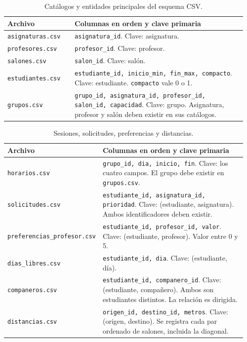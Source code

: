 \documentclass[11pt]{article}
\numberwithin{equation}{section}
\numberwithin{figure}{section}
\numberwithin{table}{section}
\theoremstyle{definition}
\begin{document}
\begin{table}[H]
\centering
\caption{Catálogos y entidades principales del esquema CSV.}
\small
\begin{tabular}{@{}p{0.27\linewidth}p{0.69\linewidth}@{}}
\toprule
\textbf{Archivo} & \textbf{Columnas en orden y clave primaria} \\
\midrule
\texttt{asignaturas.csv} &
\texttt{asignatura\_id}. Clave: asignatura. \\
\texttt{profesores.csv} &
\texttt{profesor\_id}. Clave: profesor. \\
\texttt{salones.csv} &
\texttt{salon\_id}. Clave: salón. \\
\texttt{estudiantes.csv} &
\texttt{estudiante\_id, inicio\_min, fin\_max, compacto}.\newline
Clave: estudiante. \texttt{compacto} vale 0 o 1. \\
\texttt{grupos.csv} &
\texttt{grupo\_id, asignatura\_id, profesor\_id,}\newline
\texttt{salon\_id, capacidad}. Clave: grupo. Asignatura,
profesor y salón deben existir en sus catálogos. \\
\bottomrule
\end{tabular}
\end{table}

\begin{table}[H]
\centering
\caption{Sesiones, solicitudes, preferencias y distancias.}
\small
\begin{tabular}{@{}p{0.27\linewidth}p{0.69\linewidth}@{}}
\toprule
\textbf{Archivo} & \textbf{Columnas en orden y clave primaria} \\
\midrule
\texttt{horarios.csv} &
\texttt{grupo\_id, dia, inicio, fin}. Clave: los cuatro campos.
El grupo debe existir en \texttt{grupos.csv}. \\
\texttt{solicitudes.csv} &
\texttt{estudiante\_id, asignatura\_id, prioridad}. Clave:
(estudiante, asignatura). Ambos identificadores deben existir. \\
\texttt{preferencias\_}\newline\texttt{profesor.csv} &
\texttt{estudiante\_id, profesor\_id, valor}. Clave:
(estudiante, profesor). Valor entre 0 y 5. \\
\texttt{dias\_libres.csv} &
\texttt{estudiante\_id, dia}. Clave: (estudiante, día). \\
\texttt{companeros.csv} &
\texttt{estudiante\_id, companero\_id}. Clave: (estudiante,
compañero). Ambos son estudiantes distintos. La relación es dirigida. \\
\texttt{distancias.csv} &
\texttt{origen\_id, destino\_id, metros}. Clave: (origen, destino).
Se registra cada par ordenado de salones, incluida la diagonal. \\
\bottomrule
\end{tabular}
\end{table}
\end{document}
